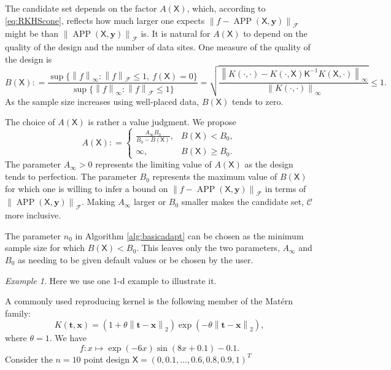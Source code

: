 \documentclass[]{mcom-l}
\theoremstyle{remark}
\newtheorem{example}{Example}
\DeclareMathOperator{\APP}{APP}
\newcommand{\mK}{\mathsf{K}}
\newcommand{\mX}{\mathsf{X}}
\newcommand{\bx}{{\boldsymbol{x}}}
\newcommand{\by}{{\boldsymbol{y}}}
\newcommand{\bt}{{\boldsymbol{t}}}
\newcommand{\cc}{\mathcal{C}}
\newcommand{\calf}{{\mathcal{F}}}
\newcommand{\norm}[2][{}]{\ensuremath{\left \lVert #2 \right \rVert}_{#1}}
\newcommand{\bignorm}[2][{}]{\ensuremath{\bigl \lVert #2 \bigr \rVert}_{#1}}
\begin{document}
The candidate set depends on the factor $A(\mX)$, which, according to \ref{eq:RKHScone}, reflects how much larger one expects $\bignorm[\calf]{f  - \APP(\mX,\by)}$ might be than $\bignorm[\calf]{\APP(\mX,\by)}$ is.  It is natural for $A(\mX)$ to depend  on the quality of the design and the number of data sites.  One measure of the quality of the design is 
\begin{equation} \label{eq:BX}
B(\mX) : = \frac{ \sup \{\norm[\infty]{f} :  \norm[\calf]{f}  \le 1 , \ f(\mX) = 0 \}   }  {\sup \{ \norm[\infty]{f}  : \norm[\calf]{f}  \le 1  \} }
= \sqrt{ \frac{\norm[\infty]{K(\cdot,\cdot) - K(\cdot,\mX) \mK^{-1} K(\mX,\cdot)}}{\norm[\infty]{K(\cdot,\cdot)}}} \le 1.
\end{equation}
As the sample size increases using well-placed data, $B(\mX)$ tends to zero.

The choice of $A(\mX)$ is rather a value judgment.  We propose
\begin{equation} \label{eq:an}
A(\mX): = \begin{cases} \displaystyle
\frac{A_\infty B_0}{B_0 - B(\mX)}, & B(\mX) < B_0, \\
\infty, & B(\mX) \ge B_0.
\end{cases}
\end{equation}
The parameter $A_\infty > 0$ represents the limiting value of $A(\mX)$ as the design tends to perfection.  The parameter $B_0$ represents the maximum value of $B(\mX)$ for which one is willing to infer a bound on $\bignorm[\calf]{f  - \APP(\mX,\by)}$ in terms of $\bignorm[\calf]{\APP(\mX,\by)}$.  Making $A_\infty$ larger or $B_0$ smaller makes the candidate set, $\cc$ more inclusive.

The parameter $n_0$ in Algorithm \ref{alg:basicadapt} can be chosen as the minimum sample size for which $B(\mX) < B_0$.  This leaves only the two parameters, $A_\infty$ and $B_0$ as needing to be given default values or be chosen by the user.

\begin{example}
	Here we use one 1-d example to illustrate it.
	
	A commonly used reproducing kernel is the following member of the Mat\'ern family:
	\begin{equation} \label{eq:Matern}
	K(\bt,\bx) = (1 + \theta \norm[2]{\bt-\bx}) \exp(-\theta\norm[2]{\bt-\bx}),
	\end{equation}
	where $\theta = 1$.
	We have \[f: x \mapsto \exp(-6x) \sin(8x+0.1) - 0.1.\]
	Consider the $n=10$ point design $\mX = (0, 0.1, \ldots, 0.6, 0.8, 0.9, 1)^T$
	
	
	
\end{example}
\end{document}
